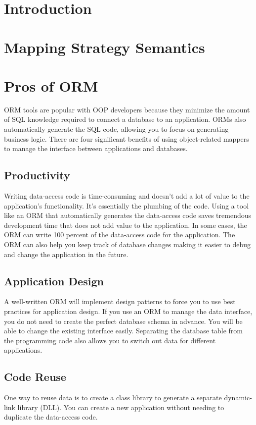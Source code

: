 \documentclass[10pt,a4paper,twoside]{article}
\begin{document}
\section{Introduction}
\item


\section{Mapping Strategy Semantics}
\item


\section{Pros of ORM}
\item ORM tools are popular with OOP developers because they minimize the amount of SQL knowledge required to connect a database to an application. ORMs also automatically generate the SQL code, allowing you to focus on generating business logic. There are four significant benefits of using object-related mappers to manage the interface between applications and databases.
\subsection{Productivity}
\item Writing data-access code is time-consuming and doesn’t add a lot of value to the application’s functionality. It’s essentially the plumbing of the code. Using a tool like an ORM that automatically generates the data-access code saves tremendous development time that does not add value to the application. In some cases, the ORM can write 100 percent of the data-access code for the application. The ORM can also help you keep track of database changes making it easier to debug and change the application in the future.
\subsection{Application Design}
\item A well-written ORM will implement design patterns to force you to use best practices for application design. If you use an ORM to manage the data interface, you do not need to create the perfect database schema in advance. You will be able to change the existing interface easily. Separating the database table from the programming code also allows you to switch out data for different applications.
\subsection{Code Reuse}
\item One way to reuse data is to create a class library to generate a separate dynamic-link library (DLL). You can create a new application without needing to duplicate the data-access code.
\end{document}
